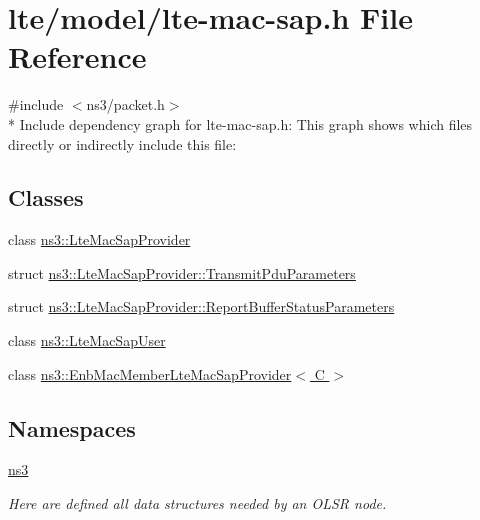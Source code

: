 \hypertarget{lte-mac-sap_8h}{}\section{lte/model/lte-\/mac-\/sap.h File Reference}
\label{lte-mac-sap_8h}
{\ttfamily \#include $<$ns3/packet.\+h$>$}\\*
Include dependency graph for lte-\/mac-\/sap.h\+:
This graph shows which files directly or indirectly include this file\+:
\subsection*{Classes}
\begin{DoxyCompactItemize}
\item 
class \hyperlink{classns3_1_1LteMacSapProvider}{ns3\+::\+Lte\+Mac\+Sap\+Provider}
\item 
struct \hyperlink{structns3_1_1LteMacSapProvider_1_1TransmitPduParameters}{ns3\+::\+Lte\+Mac\+Sap\+Provider\+::\+Transmit\+Pdu\+Parameters}
\item 
struct \hyperlink{structns3_1_1LteMacSapProvider_1_1ReportBufferStatusParameters}{ns3\+::\+Lte\+Mac\+Sap\+Provider\+::\+Report\+Buffer\+Status\+Parameters}
\item 
class \hyperlink{classns3_1_1LteMacSapUser}{ns3\+::\+Lte\+Mac\+Sap\+User}
\item 
class \hyperlink{classns3_1_1EnbMacMemberLteMacSapProvider}{ns3\+::\+Enb\+Mac\+Member\+Lte\+Mac\+Sap\+Provider$<$ C $>$}
\end{DoxyCompactItemize}
\subsection*{Namespaces}
\begin{DoxyCompactItemize}
\item 
 \hyperlink{namespacens3}{ns3}
\begin{DoxyCompactList}\small\item\em Here are defined all data structures needed by an O\+L\+SR node. \end{DoxyCompactList}\end{DoxyCompactItemize}
